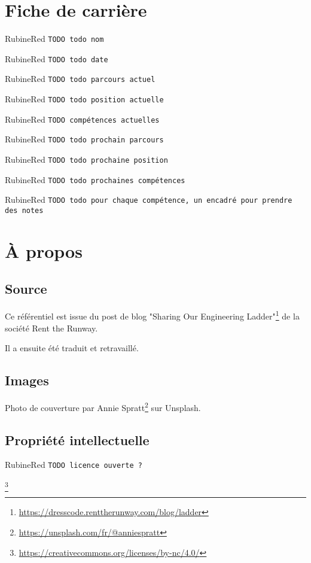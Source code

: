\documentclass[a4paper, french, openany, 12pt]{book}
\newcommand{\todo}[1]{
  \begin{color}{RubineRed}
    \texttt{TODO {#1}}
  \end{color}
}
\begin{document}
\backmatter

\chapter*{Fiche de carrière}

\todo{todo nom}

\todo{todo date}

\todo{todo parcours actuel}

\todo{todo position actuelle}

\todo{compétences actuelles}

\todo{todo prochain parcours}

\todo{todo prochaine position}

\todo{todo prochaines compétences}

\todo{todo pour chaque compétence, un encadré pour prendre des notes}

\chapter*{À propos}

\begin{multicols}{2}
  \section*{Source}
  
  Ce référentiel est issue du post de blog 
  "Sharing Our Engineering Ladder"\footnote{\url{https://dresscode.renttherunway.com/blog/ladder}}
  de la société Rent the Runway.
  
  Il a ensuite été traduit et retravaillé.
  
  \section*{Images}
  
  Photo de couverture par Annie Spratt\footnote{\url{https://unsplash.com/fr/@anniespratt}} sur Unsplash.
  
  \section*{Propriété intellectuelle}
  
  \todo{licence ouverte ?}\footnote{\url{https://creativecommons.org/licenses/by-nc/4.0/}}
\end{multicols}

\tableofcontents
\end{document}
